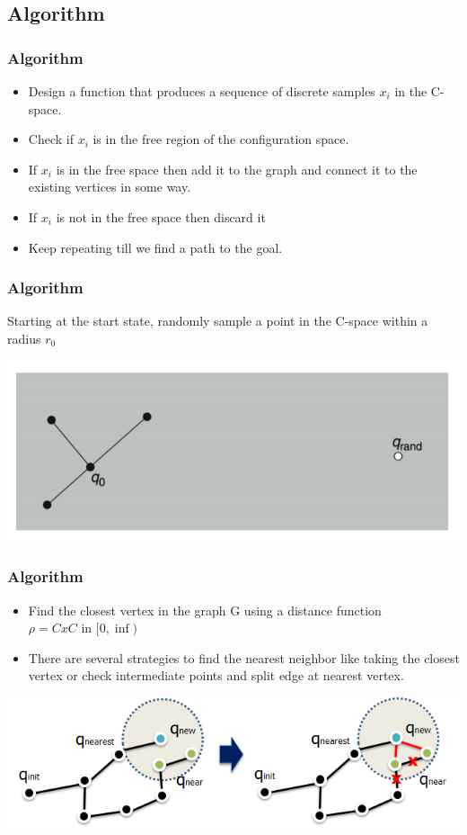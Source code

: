 \documentclass{beamer}
\begin{document}
\subsection{Algorithm}
\begin{frame}
\frametitle{Algorithm}
\begin{itemize}
\item Design a function that produces a sequence of discrete samples $x_i$ in the C-space.
\item Check if $x_i$ is in the free region of the configuration space. 
\item If $x_i$ is in the free space then add it to the graph and connect it to the existing vertices in some way.
\item If $x_i$ is not in the free space then discard it
\item Keep repeating till we find a path to the goal. 
\end{itemize}
\end{frame}
\begin{frame}
\frametitle{Algorithm}
Starting at the start state, randomly sample a point in the C-space within a radius $r_0$

\centering
 \includegraphics[width=.65\textwidth]{figures/rrt1.png}\\

\end{frame}
\begin{frame}
\frametitle{Algorithm}
\begin{itemize}
\item Find the closest vertex in the graph G using a distance function \\
\hspace{2cm} $ \rho = CxC $ in  $[0, \inf)$

\item There are several strategies to find the nearest neighbor like taking the closest vertex or check intermediate points and split edge at nearest vertex.
\end{itemize}
\centering
 \includegraphics[width=.65\textwidth]{figures/rrt2.png}\\

\end{frame}
\end{document}
